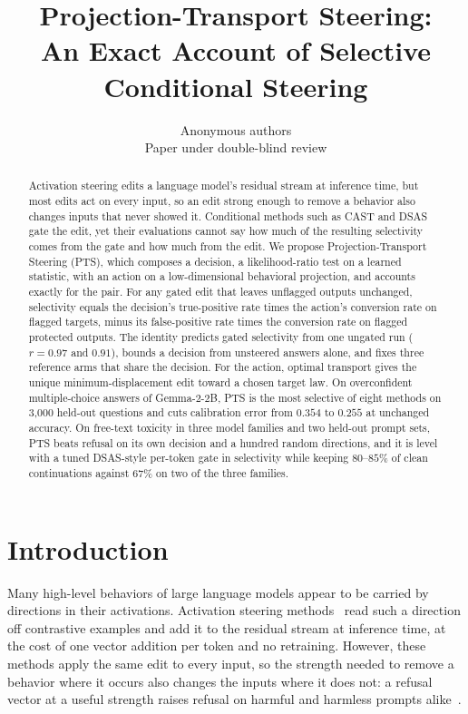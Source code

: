 \title{Projection-Transport Steering:\\ An Exact Account of Selective Conditional Steering}
\author{Anonymous authors\\Paper under double-blind review}


\maketitle

\begin{abstract}
Activation steering edits a language model's residual stream at inference
time, but most edits act on every input, so an edit strong enough to remove a
behavior also changes inputs that never showed it. Conditional methods such as
CAST and DSAS gate the edit, yet their evaluations cannot say how much of the
resulting selectivity comes from the gate and how much from the edit. We
propose Projection-Transport Steering (PTS), which composes a decision, a
likelihood-ratio test on a learned statistic, with an action on a
low-dimensional behavioral projection, and accounts exactly for the pair. For
any gated edit that leaves unflagged outputs unchanged, selectivity equals the
decision's true-positive rate times the action's conversion rate on flagged
targets, minus its false-positive rate times the conversion rate on flagged
protected outputs. The identity predicts gated selectivity from one ungated
run ($r=0.97$ and $0.91$), bounds a decision from unsteered answers alone, and
fixes three reference arms that share the decision. For the action, optimal
transport gives the unique minimum-displacement edit toward a chosen target
law. On overconfident multiple-choice answers of Gemma-2-2B, PTS is the most
selective of eight methods on 3{,}000 held-out questions and cuts calibration
error from $0.354$ to $0.255$ at unchanged accuracy. On free-text toxicity in
three model families and two held-out prompt sets, PTS beats refusal on its
own decision and a hundred random directions, and it is level with a tuned
DSAS-style per-token gate in selectivity while keeping $80$--$85\%$ of clean
continuations against $67\%$ on two of the three families.
\end{abstract}

\section{Introduction}
\label{sec:intro}

Many high-level behaviors of large language models appear to be carried by
directions in their activations. Activation steering
methods~\citep{turner2023actadd,rimsky2024caa,zou2023repe,li2023iti} read such
a direction off contrastive examples and add it to the residual stream at
inference time, at the cost of one vector addition per token and no retraining.
However, these methods apply the same edit to every input, so the strength
needed to remove a behavior where it occurs also changes the inputs where it
does not: a refusal vector at a useful strength raises refusal on harmful and
harmless prompts alike~\citep{arditi2024refusal}.

